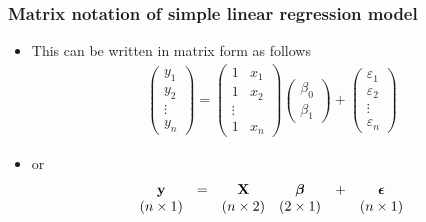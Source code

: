 \documentclass{beamer}
\begin{document}
\begin{frame}\frametitle{Matrix notation of simple linear regression model}
\begin{itemize}
\item This can be written in matrix form as follows
\begin{eqnarray*}
\left( \begin{array}{c} y_1 \\ y_2\\ \vdots\\  y_n \end{array} \right) = \left(
\begin{array}{cc} 1 & x_1 \\ 1 & x_2 \\ \vdots\\ 1 & x_n \end{array} \right) \left( \begin{array}{c} \beta_0 \\
\beta_1 \end{array} \right) + \left( \begin{array}{c} \varepsilon_1 \\
\varepsilon_2 \\ \vdots\\ \varepsilon_n \end{array} \right)
\end{eqnarray*}
\item or
\begin{eqnarray}
\begin{array}{cccccc}
{\bf y} &=&{\bf X}&\mbox{\boldmath $\beta$} & +&\mbox{\boldmath $\epsilon$} \\
(n\times 1) & &(n \times 2) &(2 \times 1) & &(n \times 1)
\end{array}
\end{eqnarray}
\end{itemize}
\end{frame}
\end{document}
